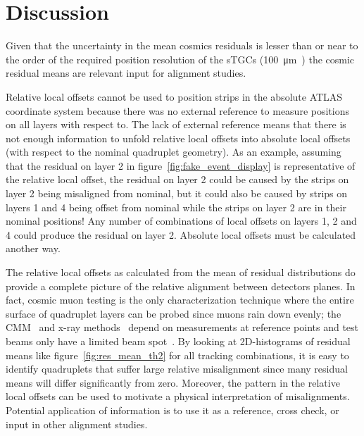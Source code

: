 \section{Discussion}

Given that the uncertainty in the mean cosmics residuals is lesser than or near to the order of the required position resolution of the sTGCs (\SI{100}{\micro\meter}~\cite{nsw_tdr}) the cosmic residual means are relevant input for alignment studies.

Relative local offsets cannot be used to position strips in the absolute ATLAS coordinate system because there was no external reference to measure positions on all layers with respect to. The lack of external reference means that there is not enough information to unfold relative local offsets into absolute local offsets (with respect to the nominal quadruplet geometry). As an example, assuming that the residual on layer 2 in figure~\ref{fig:fake_event_display} is representative of the relative local offset, the residual on layer 2 could be caused by the strips on layer 2 being misaligned from nominal, but it could also be caused by strips on layers 1 and 4 being offset from nominal while the strips on layer 2 are in their nominal positions! Any number of combinations of local offsets on layers 1, 2 and 4 could produce the residual on layer 2. Absolute local offsets must be calculated another way.

The relative local offsets as calculated from the mean of residual distributions do provide a complete picture of the relative alignment between detectors planes. In fact, cosmic muon testing is the only characterization technique where the entire surface of quadruplet layers can be probed since muons rain down evenly; the CMM~\cite{carlson_results_2019} and x-ray methods~\cite{lefebvre_precision_2020} depend on measurements at reference points and test beams only have a limited beam spot~\cite{abusleme_performance_2016}. By looking at 2D-histograms of residual means like figure~\ref{fig:res_mean_th2} for all tracking combinations, it is easy to identify quadruplets that suffer large relative misalignment since many residual means will differ significantly from zero. Moreover, the pattern in the relative local offsets can be used to motivate a physical interpretation of misalignments. Potential application of information is to use it as a reference, cross check, or input in other alignment studies.